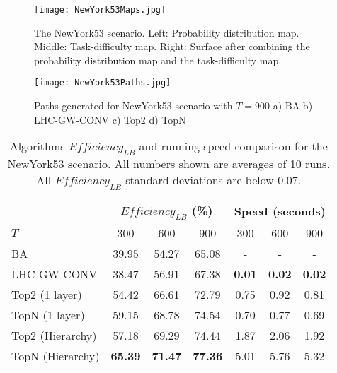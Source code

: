 \begin{figure}
\centering
\texttt{[image: NewYork53Maps.jpg]}
\caption{The NewYork53 scenario. Left: Probability distribution map. Middle: Task-difficulty map. Right: Surface after combining the probability distribution map and the task-difficulty map.}
\label{NewYork53Maps}
\end{figure}
\begin{figure}
\centering
\texttt{[image: NewYork53Paths.jpg]}
\caption{Paths generated for NewYork53 scenario with $T=900$ a) BA b) LHC-GW-CONV c) Top2 d) TopN}
\label{NewYork53Paths}
\end{figure}
\begin{table}
\caption{Algorithms $\mathit{Efficiency_{LB}}$ and running speed comparison for the NewYork53 scenario. All numbers shown are averages of 10 runs. All $\mathit{Efficiency_{LB}}$ standard deviations are below 0.07.}
	\centering
		\begin{tabular}
			{|l|c|c|c|c|c|c|}
			\hline
			 & \multicolumn{3}{|c|}{$\mathit{Efficiency_{LB}}$ (\%)} & \multicolumn{3}{|c|}{Speed (seconds)} \\
			\hline
			$T$ & 300 & 600 & 900	& 300 & 600 & 900 \\
			\hline
			BA & 39.95 & 54.27 & 65.08 & - & - & - \\
			\hline			
			LHC-GW-CONV & 38.47 & 56.91 & 67.38 & \textbf{0.01} & \textbf{0.02} & \textbf{0.02} \\
			\hline			
			Top2 (1 layer)	& 54.42 & 66.61 & 72.79 & 0.75 & 0.92 & 0.81 \\ 
			\hline
			TopN (1 layer)	& 59.15 & 68.78 & 74.54 & 0.70 & 0.77 & 0.69 \\ 
			\hline
			Top2 (Hierarchy) & 57.18 & 69.29 & 74.44 & 1.87 & 2.06 & 1.92 \\ 
			\hline
			TopN (Hierarchy) & \textbf{65.39} & \textbf{71.47} & \textbf{77.36} & 5.01 & 5.76 & 5.32 \\ 
			\hline			
		\end{tabular}
\label{NewYork53}
\end{table}

